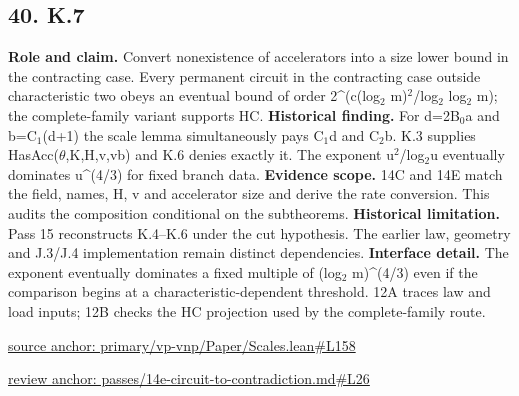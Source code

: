 \documentclass[11pt,letterpaper]{article}
\theoremstyle{definition}\newtheorem{definition}[theorem]{Definition}\newtheorem{example}[theorem]{Example}
\theoremstyle{remark}\newtheorem{remark}[theorem]{Remark}
\begin{document}
\subsection*{40. K.7}
\textbf{Role and claim.} Convert nonexistence of accelerators into a size lower bound in the contracting case. Every permanent circuit in the contracting case outside characteristic two obeys an eventual bound of order 2\textasciicircum{}(c(log\ensuremath{{}_2} m)\ensuremath{{}^2}/log\ensuremath{{}_2} log\ensuremath{{}_2} m); the complete-family variant supports HC.
\textbf{Historical finding.} For d=2B\ensuremath{{}_0}a and b=C\ensuremath{{}_1}(d+1) the scale lemma simultaneously pays C\ensuremath{{}_1}d and C\ensuremath{{}_2}b. K.3 supplies HasAcc(\ensuremath{\theta},K,H,v,vb) and K.6 denies exactly it. The exponent u\ensuremath{{}^2}/log\ensuremath{{}_2}u eventually dominates u\textasciicircum{}(4/3) for fixed branch data.
\textbf{Evidence scope.} 14C and 14E match the field, names, H, v and accelerator size and derive the rate conversion. This audits the composition conditional on the subtheorems.
\textbf{Historical limitation.} Pass 15 reconstructs K.4–K.6 under the cut hypothesis. The earlier law, geometry and J.3/J.4 implementation remain distinct dependencies.
\textbf{Interface detail.} The exponent eventually dominates a fixed multiple of (log\ensuremath{{}_2} m)\textasciicircum{}(4/3) even if the comparison begins at a characteristic-dependent threshold. 12A traces law and load inputs; 12B checks the HC projection used by the complete-family route.
\par\href{https://github.com/nousentllc/VP-VNP-Review/blob/8a7976933b6b2b4ffda1ad3a0dfb5fc6b6f023e8/primary/vp-vnp/Paper/Scales.lean\#L158}{source anchor: primary/vp-vnp/Paper/Scales.lean\#L158}
\par\href{https://github.com/nousentllc/VP-VNP-Review/blob/8a7976933b6b2b4ffda1ad3a0dfb5fc6b6f023e8/passes/14e-circuit-to-contradiction.md\#L26}{review anchor: passes/14e-circuit-to-contradiction.md\#L26}
\goodbreak
{}
\hypertarget{claim.41}{}
\end{document}
